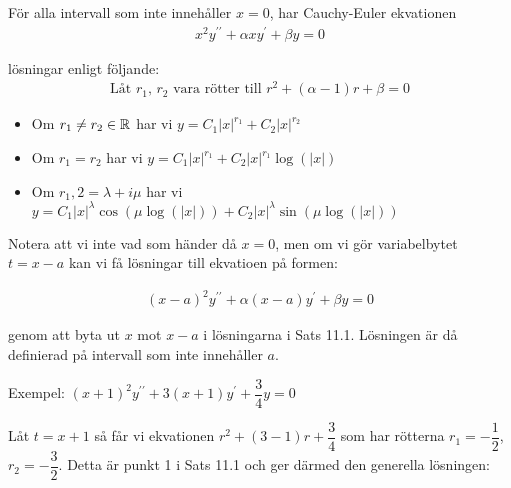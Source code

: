 \begin{theo}
  För alla intervall som inte innehåller $x=0$, har Cauchy-Euler ekvationen 
  \begin{equation*}
    \begin{gathered}
      x^2y^{\prime\prime}+\alpha xy^{\prime}+\beta y =0
    \end{gathered}
  \end{equation*}\par
  \noindent lösningar enligt följande:
  \begin{equation*}
    \begin{gathered}
      \text{Låt $r_1$, $r_2$ vara rötter till } r^2+(\alpha-1)r+\beta=0
    \end{gathered}
  \end{equation*}\par
  \begin{itemize}
    \item Om $r_1\neq r_2\in\mathbb{R}$ har vi $y = C_1\left|x\right|^{r_1}+C_2\left|x\right|^{r_2}$
    \item Om $r_1 = r_2$ har vi $y = C_1\left|x\right|^{r_1}+C_2\left|x\right|^{r_1}\log(\left|x\right|)$
    \item Om $r_1,2 = \lambda+i\mu$ har vi $y = C_1\left|x\right|^{\lambda}\cos(\mu\log(\left|x\right|))+C_2\left|x\right|^{\lambda}\sin(\mu\log(\left|x\right|))$
  \end{itemize}
\end{theo}
\par\bigskip
\noindent Notera att vi inte vad som händer då $x=0$, men om vi gör variabelbytet $t = x-a$ kan vi få lösningar till ekvatioen på formen:


\begin{equation*}
  \begin{gathered}
    (x-a)^2y^{\prime\prime}+\alpha(x-a)y^{\prime}+\beta y =0
  \end{gathered}
\end{equation*}
\par\bigskip
\noindent genom att byta ut $x$ mot $x-a$ i lösningarna i Sats 11.1. Lösningen är då definierad på intervall som inte innehåller $a$.
\par\bigskip
\noindent Exempel: $(x+1)^2y^{\prime\prime}+3(x+1)y^{\prime}+\dfrac{3}{4}y=0$
\par\bigskip
\noindent Låt $t=x+1$ så får vi ekvationen $r^2+(3-1)r+\dfrac{3}{4}$ som har rötterna $r_1 = -\dfrac{1}{2}$, $r_2 = -\dfrac{3}{2}$. Detta är punkt 1 i Sats 11.1 och ger därmed den generella lösningen:

